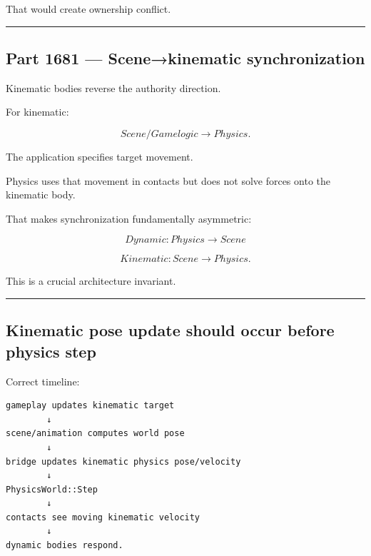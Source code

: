That would create ownership conflict.

\begin{center}\rule{0.5\linewidth}{0.5pt}\end{center}

\subsection{Part 1681 --- Scene→kinematic synchronization}\label{06-engine-ii-ch037-part-1681-scenekinematic-synchronization}

\hypertarget{06-engine-ii-ch037-part-1681-scenekinematic-synchronization}{}

Kinematic bodies reverse the authority direction.

For kinematic:

\[
\boxed{
Scene/Game logic\rightarrow Physics.
}
\]

The application specifies target movement.

Physics uses that movement in contacts but does not solve forces onto the kinematic body.

That makes synchronization fundamentally asymmetric:

\[
Dynamic:
Physics\rightarrow Scene
\]

\[
Kinematic:
Scene\rightarrow Physics.
\]

This is a crucial architecture invariant.

\begin{center}\rule{0.5\linewidth}{0.5pt}\end{center}

\subsection{Kinematic pose update should occur before physics step}\label{06-engine-ii-ch037-kinematic-pose-update-should-occur-before-physics-step}

\hypertarget{06-engine-ii-ch037-kinematic-pose-update-should-occur-before-physics-step}{}

Correct timeline:

\begin{verbatim}
gameplay updates kinematic target
        ↓
scene/animation computes world pose
        ↓
bridge updates kinematic physics pose/velocity
        ↓
PhysicsWorld::Step
        ↓
contacts see moving kinematic velocity
        ↓
dynamic bodies respond.
\end{verbatim}

